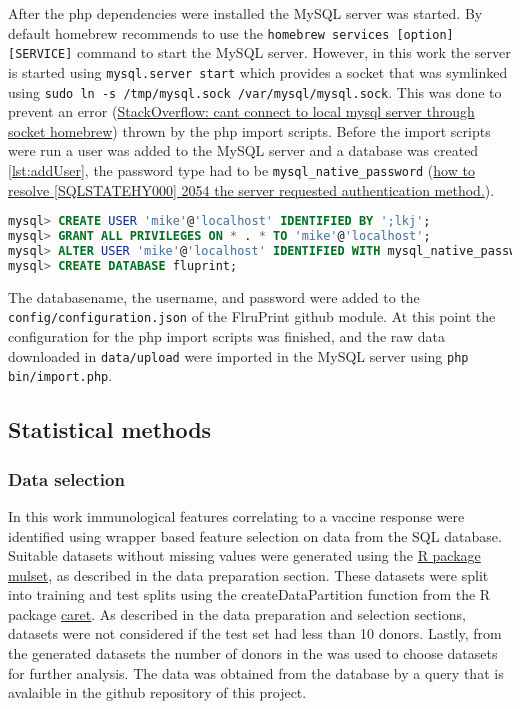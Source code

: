 After the php dependencies were installed the MySQL server was started. By
default homebrew recommends to use the \lstinline{homebrew services [option] [SERVICE]} command to start the MySQL server. However, in this work the server
is started using \lstinline{mysql.server start} which provides a socket that
was symlinked using \lstinline{sudo ln -s /tmp/mysql.sock /var/mysql/mysql.sock}. This was done to prevent an error
(\href{https://stackoverflow.com/questions/15016376/cant-connect-to-local-mysql-server-through-socket-homebrew/18090173}{StackOverflow: cant connect to local mysql server through socket homebrew}) thrown
by the php import scripts. Before the import scripts were run a user was added to the
MySQL server and a database was created \ref{lst:addUser}, the password type had to be \lstinline{mysql_native_password}
(\href{https://stackoverflow.com/questions/62873680/how-to-resolve-sqlstatehy000-2054-the-server-requested-authentication-metho}{how to resolve [SQLSTATEHY000] 2054 the server requested authentication method.}).

\begin{lstlisting}[language=sql, caption=Adding user and database to sql server, label={lst:addUser}]
mysql> CREATE USER 'mike'@'localhost' IDENTIFIED BY ';lkj';
mysql> GRANT ALL PRIVILEGES ON * . * TO 'mike'@'localhost';
mysql> ALTER USER 'mike'@'localhost' IDENTIFIED WITH mysql_native_password BY 'mike';
mysql> CREATE DATABASE fluprint;
\end{lstlisting}

The databasename, the username, and password were added to the
\lstinline{config/configuration.json} of the FlruPrint github module. At this
point the configuration for the php import scripts was finished, and the raw
data downloaded in \lstinline{data/upload} were imported in the MySQL server
using \lstinline{php bin/import.php}.

\subsection{Statistical methods}

\subsubsection{Data selection}

In this work immunological features correlating to a vaccine response were identified using wrapper based feature selection on data from the \flup SQL database.
Suitable datasets without missing values were generated using the \href{https://cran.r-project.org/web/packages/mulset/index.html}{R package mulset}, as described in the data preparation section.
These datasets were split into training and test splits using the createDataPartition function from the R package \href{https://topepo.github.io/caret/}{caret}.
As described in the data preparation and selection sections, datasets were not considered if the test set had less than 10 donors.
Lastly, from the generated datasets the number of donors in the \secondvis was used to choose datasets for further analysis. The \secondvis data was obtained from the database by a query that is avalaible in the github repository of this project.

